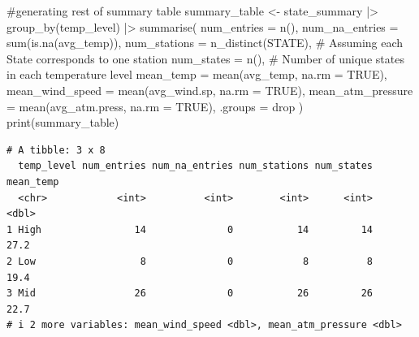 \documentclass[
  letterpaper,
  DIV=11,
  numbers=noendperiod]{scrartcl}
\newenvironment{Shaded}{\begin{snugshade}}{\end{snugshade}}
\newcommand{\AttributeTok}[1]{\textcolor[rgb]{0.40,0.45,0.13}{#1}}
\newcommand{\CommentTok}[1]{\textcolor[rgb]{0.37,0.37,0.37}{#1}}
\newcommand{\ConstantTok}[1]{\textcolor[rgb]{0.56,0.35,0.01}{#1}}
\newcommand{\FunctionTok}[1]{\textcolor[rgb]{0.28,0.35,0.67}{#1}}
\newcommand{\NormalTok}[1]{\textcolor[rgb]{0.00,0.23,0.31}{#1}}
\newcommand{\OtherTok}[1]{\textcolor[rgb]{0.00,0.23,0.31}{#1}}
\newcommand{\SpecialCharTok}[1]{\textcolor[rgb]{0.37,0.37,0.37}{#1}}
\newcommand{\StringTok}[1]{\textcolor[rgb]{0.13,0.47,0.30}{#1}}
\begin{document}
\begin{Shaded}
\begin{Highlighting}[]
\CommentTok{\#generating rest of summary table}
\NormalTok{summary\_table }\OtherTok{\textless{}{-}}\NormalTok{ state\_summary }\SpecialCharTok{|\textgreater{}}
\FunctionTok{group\_by}\NormalTok{(temp\_level) }\SpecialCharTok{|\textgreater{}}
\FunctionTok{summarise}\NormalTok{(}
    \AttributeTok{num\_entries =} \FunctionTok{n}\NormalTok{(),}
    \AttributeTok{num\_na\_entries =} \FunctionTok{sum}\NormalTok{(}\FunctionTok{is.na}\NormalTok{(avg\_temp)),}
    \AttributeTok{num\_stations =} \FunctionTok{n\_distinct}\NormalTok{(STATE),  }\CommentTok{\# Assuming each State corresponds to one station}
    \AttributeTok{num\_states =} \FunctionTok{n}\NormalTok{(),  }\CommentTok{\# Number of unique states in each temperature level}
    \AttributeTok{mean\_temp =} \FunctionTok{mean}\NormalTok{(avg\_temp, }\AttributeTok{na.rm =} \ConstantTok{TRUE}\NormalTok{),}
    \AttributeTok{mean\_wind\_speed =} \FunctionTok{mean}\NormalTok{(avg\_wind.sp, }\AttributeTok{na.rm =} \ConstantTok{TRUE}\NormalTok{),}
    \AttributeTok{mean\_atm\_pressure =} \FunctionTok{mean}\NormalTok{(avg\_atm.press, }\AttributeTok{na.rm =} \ConstantTok{TRUE}\NormalTok{),}
    \AttributeTok{.groups =} \StringTok{\textquotesingle{}drop\textquotesingle{}}
\NormalTok{  )}
\FunctionTok{print}\NormalTok{(summary\_table)}
\end{Highlighting}
\end{Shaded}

\begin{verbatim}
# A tibble: 3 x 8
  temp_level num_entries num_na_entries num_stations num_states mean_temp
  <chr>            <int>          <int>        <int>      <int>     <dbl>
1 High                14              0           14         14      27.2
2 Low                  8              0            8          8      19.4
3 Mid                 26              0           26         26      22.7
# i 2 more variables: mean_wind_speed <dbl>, mean_atm_pressure <dbl>
\end{verbatim}
\end{document}
